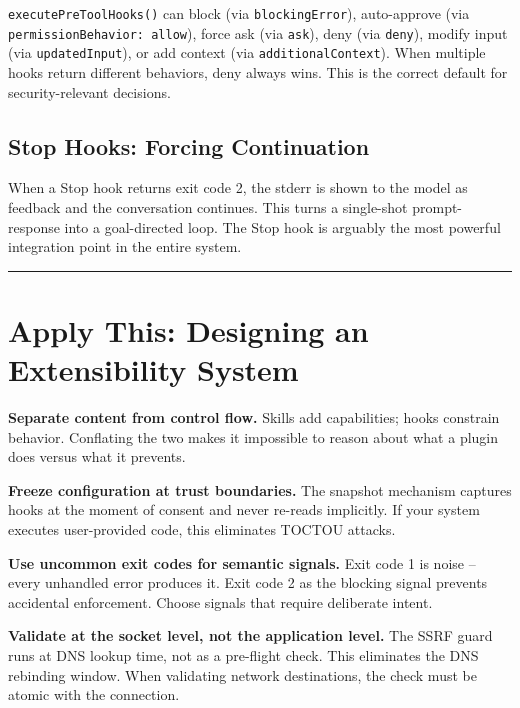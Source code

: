 \documentclass[
  english,
  11pt,
  letterpaper,
]{book}
\begin{document}
\texttt{executePreToolHooks()} can block (via \texttt{blockingError}),
auto-approve (via
\texttt{permissionBehavior:\ \textquotesingle{}allow\textquotesingle{}}),
force ask (via \texttt{\textquotesingle{}ask\textquotesingle{}}), deny
(via \texttt{\textquotesingle{}deny\textquotesingle{}}), modify input
(via \texttt{updatedInput}), or add context (via
\texttt{additionalContext}). When multiple hooks return different
behaviors, deny always wins. This is the correct default for
security-relevant decisions.

\subsection{Stop Hooks: Forcing
Continuation}\label{stop-hooks-forcing-continuation}

When a Stop hook returns exit code 2, the stderr is shown to the model
as feedback and the conversation continues. This turns a single-shot
prompt-response into a goal-directed loop. The Stop hook is arguably the
most powerful integration point in the entire system.

\begin{center}\rule{0.5\linewidth}{0.5pt}\end{center}

\section{Apply This: Designing an Extensibility
System}\label{apply-this-designing-an-extensibility-system}

\textbf{Separate content from control flow.} Skills add capabilities;
hooks constrain behavior. Conflating the two makes it impossible to
reason about what a plugin does versus what it prevents.

\textbf{Freeze configuration at trust boundaries.} The snapshot
mechanism captures hooks at the moment of consent and never re-reads
implicitly. If your system executes user-provided code, this eliminates
TOCTOU attacks.

\textbf{Use uncommon exit codes for semantic signals.} Exit code 1 is
noise -- every unhandled error produces it. Exit code 2 as the blocking
signal prevents accidental enforcement. Choose signals that require
deliberate intent.

\textbf{Validate at the socket level, not the application level.} The
SSRF guard runs at DNS lookup time, not as a pre-flight check. This
eliminates the DNS rebinding window. When validating network
destinations, the check must be atomic with the connection.
\end{document}
